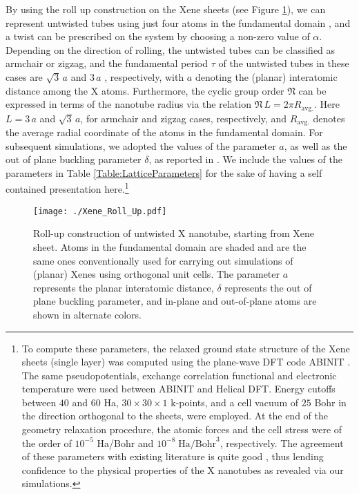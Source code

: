 \documentclass[preprint,12pt, 3p, sort&compress]{elsarticle}
\begin{document}
By using the roll up construction on the Xene sheets (see Figure \ref{fig:Xene_Roll_Up}), we can represent untwisted tubes using just four atoms in the fundamental domain \citep{ghosh2019symmetry, James_OS, Dumitrica_James_OMD}, and a twist can be prescribed on the system by choosing a non-zero value of $\alpha$. Depending on the direction of rolling, the untwisted tubes can be classified as armchair or zigzag, and the fundamental period $\tau$ of the untwisted tubes in these cases are $\sqrt{3}\,a$ and $3\,a$ , respectively, with $a$ denoting the (planar) interatomic distance among the X atoms. Furthermore, the cyclic group order $\mathfrak{N}$ can be expressed in terms of the nanotube radius via the relation ${\mathfrak{N}}\,L = 2\pi R_{\text{avg.}}$. Here  $L = 3\,a$  and $\sqrt{3}\,a$, for armchair and zigzag cases, respectively, and $R_{\text{avg.}}$ denotes the average radial coordinate of the atoms in the fundamental domain. For subsequent simulations, we adopted the values of the parameter $a$, as well as the out of plane buckling parameter $\delta$, as reported in \citep{ghosh2019symmetry}. We include the values of the parameters in Table \ref{Table:LatticeParameters} for the sake of having a self contained presentation here.\footnote{To compute these parameters, the relaxed ground state structure of the Xene sheets (single layer) was computed using the plane-wave DFT code ABINIT \citep{Gonze_ABINIT_1, gonze2016recent}. The same pseudopotentials, exchange correlation functional and electronic temperature were used between ABINIT and Helical DFT. Energy cutoffs between $40$ and $60$ Ha, $30 \times 30 \times 1$ k-points, and  a cell vacuum of $25$ Bohr in the direction orthogonal to the sheets, were employed. At the end of the geometry relaxation procedure, the atomic forces and the cell stress were of the order of $10^{-5}$ Ha/Bohr  and $10^{-8}\;\text{Ha/Bohr}^3$, respectively. The agreement of these parameters with existing literature is quite good \citep{ghosh2019symmetry}, thus lending confidence to the physical properties of the X nanotubes as revealed via our simulations.}
\begin{figure}[ht]
\centering
{\texttt{[image: ./Xene\_Roll\_Up.pdf]}}
\caption{Roll-up construction of untwisted X nanotube, starting from Xene sheet. Atoms in the fundamental domain are shaded and are the same ones conventionally used for carrying out simulations of (planar) Xenes using orthogonal unit cells. The parameter $a$ represents the planar interatomic distance, $\delta$ represents the out of plane buckling parameter, and in-plane and out-of-plane atoms are shown in alternate colors.}
\label{fig:Xene_Roll_Up}
\end{figure}
\end{document}
